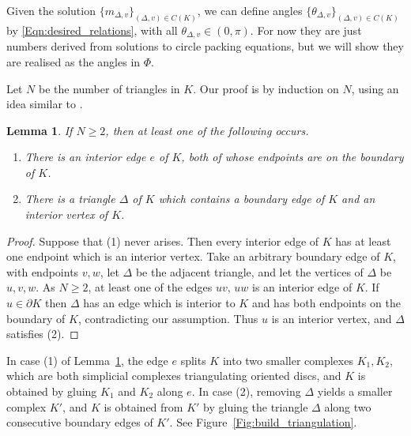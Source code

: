 \documentclass[12pt]{amsart}
\numberwithin{equation}{section}
\newtheorem{lem}[equation]{Lemma}
\theoremstyle{named}
\newcommand{\reffig}[1]{Figure~\ref{Fig:#1}}
\newcommand{\refeqn}[1]{\eqref{Eqn:#1}}
\newcommand{\reflem}[1]{Lemma~\ref{Lem:#1}}
\begin{document}
Given the solution $\{m_{\Delta,v}\}_{(\Delta,v) \in C(K)}$, we can define angles $\{\theta_{\Delta,v}\}_{(\Delta,v) \in C(K)}$ by \refeqn{desired_relations}, with all $\theta_{\Delta,v} \in (0, \pi)$. For now they are just numbers derived from solutions to circle packing equations, but we will show they are realised as the angles in $\Phi$.

Let $N$ be the number of triangles in $K$. Our proof is by induction on $N$, using an idea similar to \cite[section 6.3]{StephensonKenneth2005Itcp}.
\begin{lem}
\label{Lem:build_triangulation}
If $N \geq 2$, then at least one of the following occurs.
\begin{enumerate}
\item 
There is an interior edge $e$ of $K$, both of whose endpoints are on the boundary of $K$. 
\item 
There is a triangle $\Delta$ of $K$ which contains a boundary edge of $K$ and an interior vertex of $K$.
\end{enumerate}
\end{lem}

\begin{proof}
Suppose that (1) never arises. Then every interior edge of $K$ has at least one endpoint which is an interior vertex. Take an arbitrary boundary edge of $K$, with endpoints $v,w$, let $\Delta$ be the adjacent triangle, and let the vertices of $\Delta$ be $u,v,w$. As $N \geq 2$, at least one of the edges $uv$, $uw$ is an interior edge of $K$. If $u \in \partial K$ then $\Delta$ has an edge which is interior to $K$ and has both endpoints on the boundary of $K$, contradicting our assumption. Thus $u$ is an interior vertex, and $\Delta$ satisfies (2).
\end{proof}

In case (1) of \reflem{build_triangulation}, the edge $e$ splits $K$ into two smaller complexes $K_1, K_2$, which are both simplicial complexes triangulating oriented discs, and $K$ is obtained by gluing $K_1$ and $K_2$ along $e$. In case (2), removing $\Delta$ yields a smaller complex $K'$, and $K$ is obtained from $K'$ by gluing the triangle $\Delta$ along two consecutive boundary edges of $K'$. See \reffig{build_triangulation}.
\end{document}
